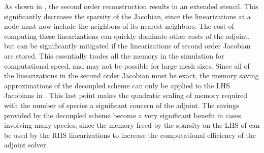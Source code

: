 As shown in , the second order
reconstruction results in an extended stencil.  This significantly decreases the
sparsity of the Jacobian, since the linearizations at a node must now include
the neighbors of its nearest neighbors.  The cost of computing these
linearizations can quickly dominate other costs of the adjoint, but can be
significantly mitigated if the linearizations of second order Jacobian are
stored.  This essentially trades all the memory in the simulation for
computational speed, and may not be possible for large mesh sizes.  Since all of
the linearizations in the second order Jacobian must be exact, the memory saving
approximations of the decoupled scheme can only be applied to the LHS Jacobians
in .  This last point
makes the quadratic scaling of memory required with the number of species a
significant concern of the adjoint.  The savings provided by the decoupled
scheme become a very significant benefit in cases involving many species, since
the memory freed by the sparsity on the LHS of
 can be used by the RHS
linearizations to increase the computational efficiency of the adjoint solver.
